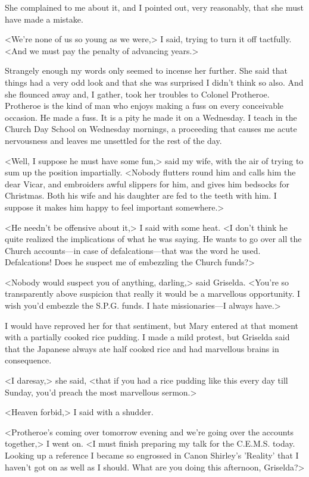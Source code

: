 She complained to me about it, and I pointed out, very reasonably, that she must have made a mistake.

<We're none of us so young as we were,> I said, trying to turn it off tactfully. <And we must pay the penalty of advancing years.>

Strangely enough my words only seemed to incense her further. She said that things had a very odd look and that she was surprised I didn't think so also. And she flounced away and, I gather, took her troubles to Colonel Protheroe. Protheroe is the kind of man who enjoys making a fuss on every conceivable occasion. He made a fuss. It is a pity he made it on a Wednesday. I teach in the Church Day School on Wednesday mornings, a proceeding that causes me acute nervousness and leaves me unsettled for the rest of the day.

<Well, I suppose he must have some fun,> said my wife, with the air of trying to sum up the position impartially. <Nobody flutters round him and calls him the dear Vicar, and embroiders awful slippers for him, and gives him bedsocks for Christmas. Both his wife and his daughter are fed to the teeth with him. I suppose it makes him happy to feel important somewhere.>

<He needn't be offensive about it,> I said with some heat. <I don't think he quite realized the implications of what he was saying. He wants to go over all the Church accounts—in case of defalcations—that was the word he used. Defalcations! Does he suspect me of embezzling the Church funds?>

<Nobody would suspect you of anything, darling,> said Griselda. <You're so transparently above suspicion that really it would be a marvellous opportunity. I wish you'd embezzle the S.P.G. funds. I hate missionaries—I always have.>

I would have reproved her for that sentiment, but Mary entered at that moment with a partially cooked rice pudding. I made a mild protest, but Griselda said that the Japanese always ate half cooked rice and had marvellous brains in consequence.

<I daresay,> she said, <that if you had a rice pudding like this every day till Sunday, you'd preach the most marvellous sermon.>

<Heaven forbid,> I said with a shudder.

<Protheroe's coming over tomorrow evening and we're going over the accounts together,> I went on. <I must finish preparing my talk for the C.E.M.S. today. Looking up a reference I became so engrossed in Canon Shirley's 'Reality' that I haven't got on as well as I should. What are you doing this afternoon, Griselda?>

